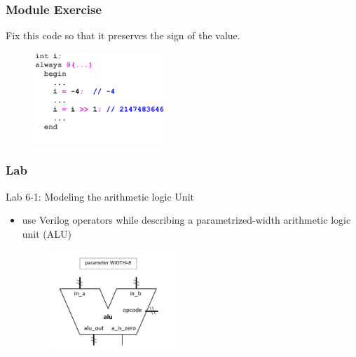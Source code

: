 \documentclass[t, notes, xcolor=table]{beamer}
\begin{document}
\begin{frame}
\frametitle{Module Exercise}
Fix this code so that it preserves the sign of the value.
\begin{figure}
    \includegraphics[width=0.45\textwidth]{img/05_exe.png}
\end{figure}
\end{frame}

\begin{frame}
\frametitle{Lab}
Lab 6-1: Modeling the arithmetic logic Unit
\begin{itemize}
\item use Verilog operators while describing a parametrized-width arithmetic logic unit (ALU)

\begin{figure}
    \includegraphics[width=0.45\textwidth]{img/05_lab.png}
\end{figure}


\end{itemize}
\end{frame}
\end{document}
